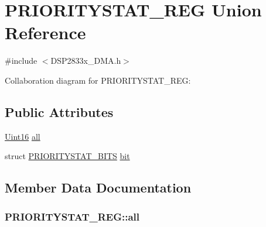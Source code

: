\hypertarget{union_p_r_i_o_r_i_t_y_s_t_a_t___r_e_g}{}\section{P\+R\+I\+O\+R\+I\+T\+Y\+S\+T\+A\+T\+\_\+\+R\+E\+G Union Reference}
\label{union_p_r_i_o_r_i_t_y_s_t_a_t___r_e_g}


{\ttfamily \#include $<$D\+S\+P2833x\+\_\+\+D\+M\+A.\+h$>$}



Collaboration diagram for P\+R\+I\+O\+R\+I\+T\+Y\+S\+T\+A\+T\+\_\+\+R\+E\+G\+:
\subsection*{Public Attributes}
\begin{DoxyCompactItemize}
\item 
\hyperlink{_d_s_p2833x___device_8h_a59a9f6be4562c327cbfb4f7e8e18f08b}{Uint16} \hyperlink{union_p_r_i_o_r_i_t_y_s_t_a_t___r_e_g_a962011f81d259d1a301ec59efced9a3e}{all}
\item 
struct \hyperlink{struct_p_r_i_o_r_i_t_y_s_t_a_t___b_i_t_s}{P\+R\+I\+O\+R\+I\+T\+Y\+S\+T\+A\+T\+\_\+\+B\+I\+T\+S} \hyperlink{union_p_r_i_o_r_i_t_y_s_t_a_t___r_e_g_af70e27b64ceb8473cfe9e47e0e172b45}{bit}
\end{DoxyCompactItemize}


\subsection{Member Data Documentation}
\hypertarget{union_p_r_i_o_r_i_t_y_s_t_a_t___r_e_g_a962011f81d259d1a301ec59efced9a3e}{}
\subsubsection[{all}]{ P\+R\+I\+O\+R\+I\+T\+Y\+S\+T\+A\+T\+\_\+\+R\+E\+G\+::all}\label{union_p_r_i_o_r_i_t_y_s_t_a_t___r_e_g_a962011f81d259d1a301ec59efced9a3e}
\hypertarget{union_p_r_i_o_r_i_t_y_s_t_a_t___r_e_g_af70e27b64ceb8473cfe9e47e0e172b45}{}
